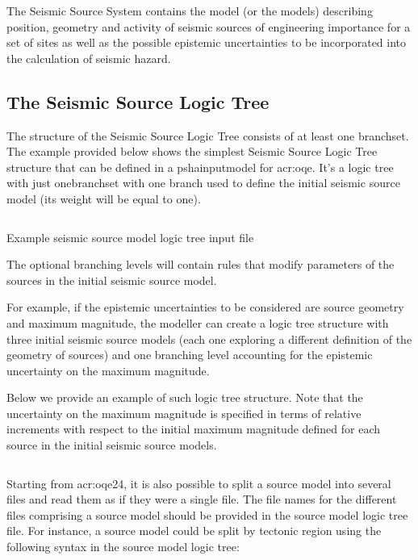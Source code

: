 The Seismic Source System contains the model (or the models) describing
position, geometry and activity of seismic sources of engineering importance
for a set of sites as well as the possible epistemic uncertainties to be
incorporated into the calculation of seismic hazard.



\subsection{The Seismic Source Logic Tree}

The structure of the Seismic Source Logic Tree consists of at least one
\gls{branchset}.
The example provided below shows the simplest Seismic Source Logic Tree
structure that can be defined in a \gls{pshainputmodel} for \gls{acr:oqe}.
It's a logic tree with just one\gls{branchset}
with one branch used to define the initial seismic source model (its weight
will be equal to one).

\begin{listing}[htbp]
  \inputminted[firstline=1,firstnumber=1,fontsize=\footnotesize,frame=single,linenos,bgcolor=lightgray]{xml}{oqum/hazard/verbatim/input_sslt.xml}
  \caption{Example seismic source model logic tree input file}
  \label{lst:input_sslt}
\end{listing}

The optional branching levels will contain rules that modify parameters of the
sources in the initial seismic source model.

For example, if the epistemic uncertainties to be considered are source
geometry and maximum magnitude, the modeller can create a logic tree structure
with three initial seismic source models (each one exploring a different
definition of the geometry of sources) and one branching level accounting for
the epistemic uncertainty on the maximum magnitude.

Below we provide an example of such logic tree structure. Note that the
uncertainty on the maximum magnitude is specified in terms of relative
increments with respect to the initial maximum magnitude defined for each
source in the initial seismic source models.

\inputminted[firstline=1,firstnumber=1,fontsize=\footnotesize,frame=single,linenos,bgcolor=lightgray]{xml}{oqum/hazard/verbatim/input_sslt_simple_lt.xml}

Starting from \glsdesc{acr:oqe24}, it is also possible to split a source model
into several files and read them as if they were a single file. The file names
for the different files comprising a source model should be provided in the
source model logic tree file. For instance, a source model could be split by
tectonic region using the following syntax in the source model logic tree:

